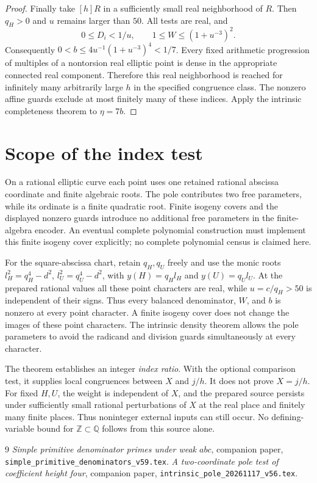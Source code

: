 \documentclass[11pt,a4paper]{article}
\newcommand{\Q}{\mathbb Q}\newcommand{\Z}{\mathbb Z}
\begin{document}
\begin{proof}
Finally take $[h]R$ in a sufficiently small real neighborhood
of $R$. Then $q_H>0$ and $u$ remains larger than $50$.
All tests are real, and
\[
       0\le D_i<1/u,\qquad
       1\le W\le(1+u^{-3})^2.
\]
Consequently $0<b\le4u^{-1}(1+u^{-3})^4<1/7$.
Every fixed arithmetic progression of multiples of a nontorsion
real elliptic point is dense in the appropriate connected real
component. Therefore this real neighborhood is reached for
infinitely many arbitrarily large $h$ in the specified congruence
class. The nonzero affine guards exclude at most finitely many
of these indices. Apply the intrinsic completeness theorem to
$\eta=7b$.
\end{proof}

\section{Scope of the index test}

On a rational elliptic curve each point uses one retained rational
abscissa coordinate and finite algebraic roots. The pole contributes
two free parameters, while its ordinate is a finite quadratic root.
Finite isogeny covers and the displayed nonzero guards introduce no
additional free parameters in the finite-algebra encoder.
An eventual complete polynomial construction must implement this
finite isogeny cover explicitly; no complete polynomial census is
claimed here.

For the square-abscissa chart, retain $q_H,q_U$ freely and use
the monic roots $l_H^2=q_H^4-d^2$, $l_U^2=q_U^4-d^2$, with
$y(H)=q_Hl_H$ and $y(U)=q_Ul_U$. At the prepared rational
values all these point characters are real, while $u=c/q_H>50$
is independent of their signs. Thus every balanced denominator,
$W$, and $b$ is nonzero at every point character. A finite isogeny
cover does not change the images of these point characters.
The intrinsic density theorem allows the pole parameters to avoid
the radicand and division guards simultaneously at every character.

The theorem establishes an integer \emph{index ratio}. With the
optional comparison test, it supplies local congruences between
$X$ and $j/h$. It does not prove $X=j/h$. For fixed $H,U$, the
weight is independent of $X$, and the prepared source persists
under sufficiently small rational perturbations of $X$ at the
real place and finitely many finite places. Thus noninteger
external inputs can still occur. No defining-variable bound for
$\Z\subset\Q$ follows from this source alone.

\begin{thebibliography}{9}
\emph{Simple primitive denominator primes under weak
$abc$}, companion paper, \nolinkurl{simple_primitive_denominators_v59.tex}.
\emph{A two-coordinate pole test of coefficient
height four}, companion paper, \nolinkurl{intrinsic_pole_20261117_v56.tex}.
\end{thebibliography}
\end{document}

